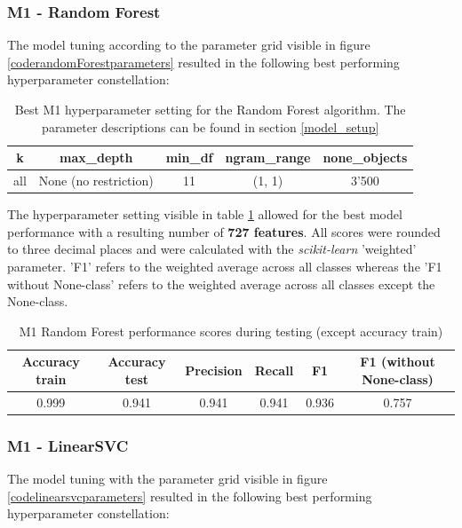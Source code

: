 \subsubsection{M1 - Random Forest}
The model tuning according to the parameter grid visible in figure \ref{coderandomForestparameters} resulted in the following best performing hyperparameter constellation:

\begin{table}[h!]
\begin{center}
\caption{Best M1 hyperparameter setting for the Random Forest algorithm. The parameter descriptions can be found in section \ref{model_setup}}\vspace{1ex}
\label{tab:m1_randomForest_bestParams}
\begin{tabular}{ccccc}\hline
k & max\_depth & min\_df & ngram\_range & none\_objects \\ \hline
all & None (no restriction) & 11 & (1, 1) & 3'500 \\ \hline
\end{tabular}
\end{center}
\end{table}

The hyperparameter setting visible in table \ref{tab:m1_randomForest_bestParams} allowed for the best model performance with a resulting number of \textbf{727 features}. All scores were rounded to three decimal places and were calculated with the \textit{scikit-learn} 'weighted' parameter. 'F1' refers to the weighted average across all classes whereas the 'F1 without None-class' refers to the weighted average across all classes except the None-class.

\begin{table}[h!]
\begin{center}
\caption{M1 Random Forest performance scores during testing (except accuracy train)}\vspace{1ex}
\label{tab:m1_randomForest_bestscores}
\begin{tabular}{cccccc}\hline
Accuracy train & Accuracy test & Precision & Recall & F1 & F1 (without None-class)\\ \hline
0.999 & 0.941 & 0.941 & 0.941 & 0.936 & 0.757 \\ \hline
\end{tabular}
\end{center}
\end{table}

\subsubsection{M1 - LinearSVC}
The model tuning with the parameter grid visible in figure \ref{codelinearsvcparameters} resulted in the following best performing hyperparameter constellation:


